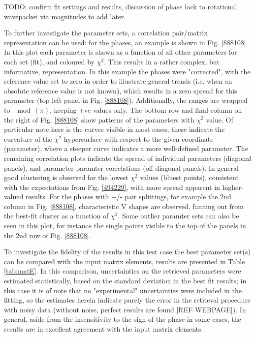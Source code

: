 TODO: confirm fit settings and results, discussion of phase lock to rotational wavepacket via magnitudes to add later.

To further investigate the parameter sets, a correlation pair/matrix representation can be used: for the phases, an example is shown in Fig. \ref{888108}. In this plot each parameter is shown as a function of all other parameters for each set (fit), and coloured by $\chi^2$. This results in a rather complex, but informative, representation. In this example the phases were "corrected", with the reference value set to zero in order to illustrate general trends (i.e. when an absolute reference value is not known), which results in a zero spread for this parameter (top left panel in Fig. \ref{888108}). Additionally, the ranges are wrapped to $\mod(\pi)$, keeping +ve values only. The bottom row and final column on the right of Fig. \ref{888108} show patterns of the parameters with $\chi^2$ value. Of particular note here is the curves visible in most cases, these indicate the curvature of the $\chi^2$ hypersurface with respect to the given coordinate (parameter), where a steeper curve indicates a more well-defined parameter. The remaining correlation plots indicate the spread of individual parameters (diagonal panels), and parameter-paramter correlations (off-diagonal panels). In general good clustering is observed for the lowest $\chi^2$ values (bluest points), consistent with the expectations from Fig. \ref{494229}, with more spread apparent in higher-valued results. For the phases with +/- pair splittings, for example the 2nd column in Fig. \ref{888108}, characteristic V shapes are observed, fanning out from the best-fit cluster as a function of $\chi^2$. Some outlier paramter sets can also be seen in this plot, for instance the single points visible to the top of the panels in the 2nd row of Fig. \ref{888108}.

To investigate the fidelity of the results in this test case the best parameter set(s) can be compared with the input matrix elements, results are presented in Table \ref{tab:matE}. In this comparison, uncertainties on the retrieved parameters were estimated statistically, based on the standard deviation in the best fit results; in this case it is of note that no "experimental" uncertainties were included in the fitting, so the estimates herein indicate purely the error in the retrieval procedure with noisy data (without noise, perfect results are found [REF WEBPAGE]). In general, aside from the insensitivity to the sign of the phase in some cases, the results are in excellent agreement with the input matrix elements.

